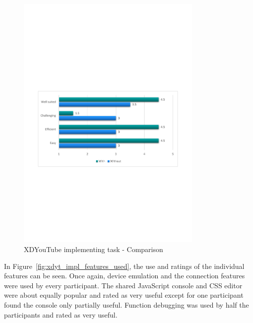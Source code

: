 \begin{figure}[H]
  \centering
    \includegraphics[trim={0 0 0.1cm 0},clip,width=0.8\textwidth]{images/charts/xdyt_impl_comparison.pdf}
	\caption[xdyt-impl: Comparison]{XDYouTube implementing task - Comparison}
	\label{fig:xdyt_impl_comparison}
\end{figure}

In Figure~\ref{fig:xdyt_impl_features_used}, the use and ratings of the individual features can be seen. Once again, device emulation and the connection features were used by every participant. The shared JavaScript console and CSS editor were about equally popular and rated as very useful except for one participant found the console only partially useful. Function debugging was used by half the participants and rated as very useful.

